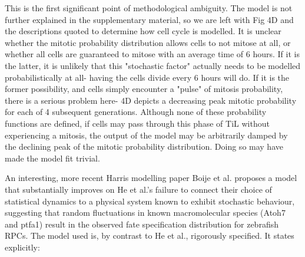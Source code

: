 This is the first significant point of methodological ambiguity. The model is not further explained in the supplementary material, so we are left with Fig 4D and the descriptions quoted to determine how cell cycle is modelled. It is unclear whether the mitotic probability distribution allows cells to not mitose at all, or whether all cells are guaranteed to mitose with an average time of 6 hours. If it is the latter, it is unlikely that this "stochastic factor" actually needs to be modelled probabilistically at all- having the cells divide every 6 hours will do. If it is the former possibility, and cells simply encounter a "pulse" of mitosis probability, there is a serious problem here- 4D depicts a decreasing peak mitotic probability for each of 4 subsequent generations. Although none of these probability functions are defined, if cells may pass through this phase of TiL without experiencing a mitosis, the output of the model may be arbitrarily damped by the declining peak of the mitotic probability distribution. Doing so may have made the model fit trivial.

An interesting, more recent Harris modelling paper Boije et al. \cite{Boije2015} proposes a model that substantially improves on He et al.'s failure to connect their choice of statistical dynamics to a physical system known to exhibit stochastic behaviour, suggesting that random fluctuations in known macromolecular species (Atoh7 and ptfa1) result in the observed fate specification distribution for zebrafish RPCs. The model used is, by contrast to He et al., rigorously specified. It states explicitly:

\bigskip

